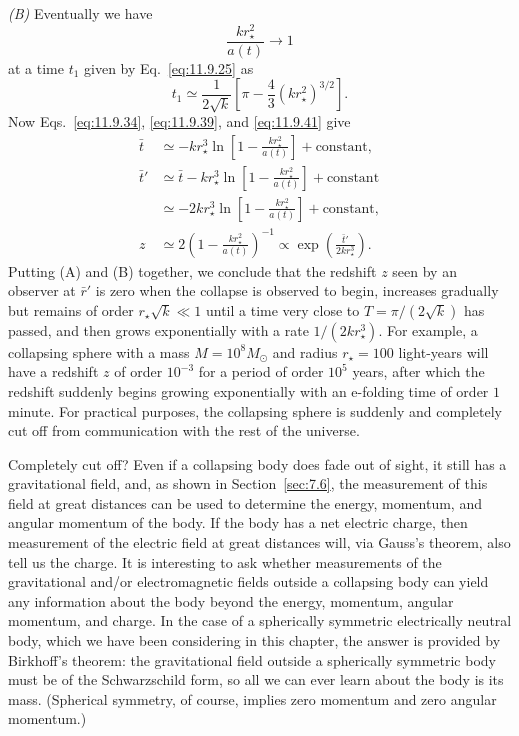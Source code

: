 \emph{(B)} Eventually we have
\[
  \frac{kr_\star^2}{a(t)}\longrightarrow1
\]
at a time \(t_1\) given by Eq.~\eqref{eq:11.9.25} as
\begin{equation}
  t_1
  \simeq
  \frac1{2\sqrt k}
  \left[\pi-\frac43(kr_\star^2)^{3/2}\right].
  \tag{11.9.45}\label{eq:11.9.45}
\end{equation}
Now Eqs.~\eqref{eq:11.9.34}, \eqref{eq:11.9.39}, and
\eqref{eq:11.9.41} give
\begin{equation}
  \begin{aligned}
  \bar t
  &\simeq
  -kr_\star^3\ln\left[1-\frac{kr_\star^2}{a(t)}\right]
  +\text{constant},\\
  \bar t'
  &\simeq
  \bar t-kr_\star^3\ln\left[1-\frac{kr_\star^2}{a(t)}\right]
  +\text{constant}\\
  &\simeq
  -2kr_\star^3\ln\left[1-\frac{kr_\star^2}{a(t)}\right]
  +\text{constant},\\
  z
  &\simeq
  2\left(1-\frac{kr_\star^2}{a(t)}\right)^{-1}
  \propto
  \exp\left(\frac{\bar t'}{2kr_\star^3}\right).
  \end{aligned}
  \tag{11.9.46}\label{eq:11.9.46}
\end{equation}
Putting (A) and (B) together, we conclude that the redshift \(z\) seen by an
observer at \(\bar r'\) is zero when the collapse is observed to begin,
increases gradually but remains of order \(r_\star\sqrt k\ll1\) until a time
very
close to \(T=\pi/(2\sqrt k)\) has passed, and then grows exponentially with
a rate \(1/(2kr_\star^3)\). For example, a collapsing sphere with a mass
\(M=10^8M_\odot\) and radius \(r_\star=100\) light-years will have a redshift
\(z\) of order \(10^{-3}\) for a period of order \(10^5\) years, after which
the redshift suddenly begins growing exponentially with an e-folding time of
order \(1\) minute. For practical purposes, the collapsing sphere is suddenly
and completely cut off from communication with the rest of the universe.

Completely cut off? Even if a collapsing body does fade out of sight, it
still has a gravitational field, and, as shown in Section~\ref{sec:7.6}, the
measurement of this field at great distances can be used to determine the
energy, momentum, and angular momentum of the body. If the body has a net
electric charge, then measurement of the electric field at great distances
will, via Gauss's theorem, also tell us the charge. It is interesting to ask
whether measurements of the gravitational and/or electromagnetic fields
outside a collapsing body can yield any information about the body beyond
the energy, momentum, angular momentum, and charge. In the case of a
spherically symmetric electrically neutral body, which we have been
considering in this chapter, the answer is provided by Birkhoff's theorem:
the gravitational field outside a spherically symmetric body must be of the
Schwarzschild form, so all we can ever learn about the body is its mass.
(Spherical symmetry, of course, implies zero momentum and zero angular
momentum.)

